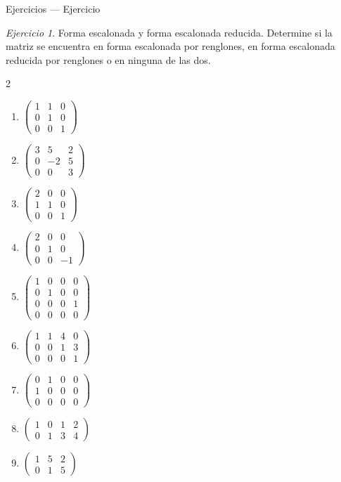 \documentclass[aspectratio=169,11pt]{beamer}
\theoremstyle{remark}
\newtheorem{Ejer}[definicion]{Ejercicio}
\begin{document}
\begin{frame}[shrink=5]{Ejercicios — Ejercicio}
\footnotesize
\begin{Ejer}
Forma escalonada y forma escalonada reducida. Determine si la matriz se encuentra en forma escalonada por renglones, en forma escalonada reducida por renglones o en ninguna de las dos.

\begin{multicols}{2}
\begin{enumerate}[resume]
\item $\begin{pmatrix}1&1&0\\0&1&0\\0&0&1\end{pmatrix}$
\item $\begin{pmatrix}3&5&2\\0&-2&5\\0&0&3\end{pmatrix}$
\item $\begin{pmatrix}2&0&0\\1&1&0\\0&0&1\end{pmatrix}$
\item $\begin{pmatrix}2&0&0\\0&1&0\\0&0&-1\end{pmatrix}$
\item $\begin{pmatrix}1&0&0&0\\0&1&0&0\\0&0&0&1\\0&0&0&0\end{pmatrix}$
\item $\begin{pmatrix}1&1&4&0\\0&0&1&3\\0&0&0&1\end{pmatrix}$
\item $\begin{pmatrix}0&1&0&0\\1&0&0&0\\0&0&0&0\end{pmatrix}$
\item $\begin{pmatrix}1&0&1&2\\0&1&3&4\end{pmatrix}$
\item $\begin{pmatrix}1&5&2\\0&1&5\end{pmatrix}$

\end{enumerate}
\end{multicols}
\end{Ejer}
\end{frame}
\end{document}
